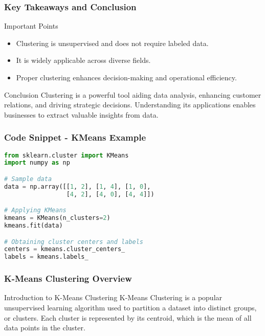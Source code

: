 \documentclass[aspectratio=169]{beamer}
\begin{document}
\begin{frame}[fragile]
    \frametitle{Key Takeaways and Conclusion}
    \begin{block}{Important Points}
        \begin{itemize}
            \item Clustering is unsupervised and does not require labeled data.
            \item It is widely applicable across diverse fields.
            \item Proper clustering enhances decision-making and operational efficiency.
        \end{itemize}
    \end{block}

    \begin{block}{Conclusion}
        Clustering is a powerful tool aiding data analysis, enhancing customer relations, and driving strategic decisions. Understanding its applications enables businesses to extract valuable insights from data.
    \end{block}
\end{frame}

\begin{frame}[fragile]
    \frametitle{Code Snippet - KMeans Example}
    \begin{lstlisting}[language=Python]
from sklearn.cluster import KMeans
import numpy as np

# Sample data
data = np.array([[1, 2], [1, 4], [1, 0], 
                 [4, 2], [4, 0], [4, 4]])

# Applying KMeans
kmeans = KMeans(n_clusters=2)
kmeans.fit(data)

# Obtaining cluster centers and labels
centers = kmeans.cluster_centers_
labels = kmeans.labels_
    \end{lstlisting}
\end{frame}

\begin{frame}[fragile]
    \frametitle{K-Means Clustering Overview}
    \begin{block}{Introduction to K-Means Clustering}
        K-Means Clustering is a popular unsupervised learning algorithm used to partition a dataset into distinct groups, or clusters. Each cluster is represented by its centroid, which is the mean of all data points in the cluster.
    \end{block}
\end{frame}
\end{document}
